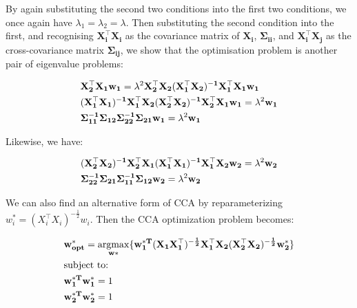 By again substituting the second two conditions into the first two conditions, we once again have $\lambda_1=\lambda_2=\lambda$. Then substituting the second condition into the first, and recognising $\mathbf{X_i^{\top}X_i}$ as the covariance matrix of $\mathbf{X_i}$, $\mathbf{\Sigma_{ii}}$, and $\mathbf{X_i^{\top}X_j}$ as the cross-covariance matrix $\mathbf{\Sigma_{ij}}$, we show that the optimisation problem is another pair of eigenvalue problems:

\begin{align}
     & \mathbf{X_2^{\top}X_1w_1}=\lambda^2\mathbf{X_2^{\top}X_2(X_1^{\top}X_2)^{-1}X_1^{\top}X_1w_1}              \\
     & \mathbf{(X_1^{\top}X_1)^{-1}X_1^{\top}X_2(X_2^{\top}X_2)^{-1}X_2^{\top}X_1w_1}=\lambda^2\mathbf{w_1}\notag \\
     & \mathbf{\Sigma_{11}^{-1}\Sigma_{12}\Sigma_{22}^{-1}\Sigma_{21}w_1}=\lambda^2\mathbf{w_1}\notag             \\
\end{align}

Likewise, we have:

\begin{align}
     & \mathbf{(X_2^{\top}X_2)^{-1}X_2^{\top}X_1(X_1^{\top}X_1)^{-1}X_1^{\top}X_2w_2}=\lambda^2\mathbf{w_2}\notag \\
     & \mathbf{\Sigma_{22}^{-1}\Sigma_{21}\Sigma_{11}^{-1}\Sigma_{12}w_2}=\lambda^2\mathbf{w_2}\notag             \\
\end{align}

We can also find an alternative form of CCA by reparameterizing $w^*_i=(X_i^{\top}X_i)^{-\frac{1}{2}}w_i$. Then the CCA optimization problem becomes:

\begin{align}
     & \mathbf{w^*_{opt}}=\underset{\mathbf{w*}}{\mathrm{argmax}}\{ \mathbf{w^{*T}_1(X_1X_1^{\top})^{-\frac{1}{2}}X_1^{\top}X_2(X_2^{\top}X_2)^{-\frac{1}{2}}w^*_2\}} \\
     & \text{subject to:} \notag                                                                                                                                      \\
     & \mathbf{w^{*T}_1w^*_1}=1 \notag                                                                                                                                \\
     & \mathbf{w^{*T}_2w^*_2}=1 \notag
\end{align}

